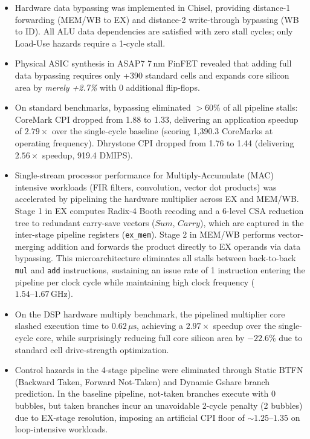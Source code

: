 \begin{itemize}
    \item Hardware data bypassing was implemented in Chisel, providing distance-1 forwarding (MEM/WB to EX) and distance-2 write-through bypassing (WB to ID). All ALU data dependencies are satisfied with zero stall cycles; only Load-Use hazards require a 1-cycle stall.
    \item Physical ASIC synthesis in ASAP7 7\,nm FinFET revealed that adding full data bypassing requires only +390 standard cells and expands core silicon area by \textit{merely +2.7\%} with 0 additional flip-flops.
    \item On standard benchmarks, bypassing eliminated $>60\%$ of all pipeline stalls: CoreMark CPI dropped from 1.88 to 1.33, delivering an application speedup of $\mathbf{2.79\times}$ over the single-cycle baseline (scoring 1,390.3 CoreMarks at operating frequency). Dhrystone CPI dropped from 1.76 to 1.44 (delivering $\mathbf{2.56\times}$ speedup, 919.4 DMIPS).
    \item Single-stream processor performance for Multiply-Accumulate (MAC) intensive workloads (FIR filters, convolution, vector dot products) was accelerated by pipelining the hardware multiplier across EX and MEM/WB. Stage 1 in EX computes Radix-4 Booth recoding and a 6-level CSA reduction tree to redundant carry-save vectors ($Sum$, $Carry$), which are captured in the inter-stage pipeline registers (\texttt{ex\_mem}). Stage 2 in MEM/WB performs vector-merging addition and forwards the product directly to EX operands via data bypassing. This microarchitecture eliminates all stalls between back-to-back \texttt{mul} and \texttt{add} instructions, sustaining an issue rate of 1 instruction entering the pipeline per clock cycle while maintaining high clock frequency ($1.54\text{--}1.67\,\text{GHz}$).
    \item On the DSP hardware multiply benchmark, the pipelined multiplier core slashed execution time to $0.62\,\mu\text{s}$, achieving a $\mathbf{2.97\times}$ speedup over the single-cycle core, while surprisingly reducing full core silicon area by $-22.6\%$ due to standard cell drive-strength optimization.
    \item Control hazards in the 4-stage pipeline were eliminated through Static BTFN (Backward Taken, Forward Not-Taken) and Dynamic Gshare branch prediction. In the baseline pipeline, not-taken branches execute with 0 bubbles, but taken branches incur an unavoidable 2-cycle penalty (2 bubbles) due to EX-stage resolution, imposing an artificial CPI floor of $\sim 1.25\text{--}1.35$ on loop-intensive workloads.

\end{itemize}
